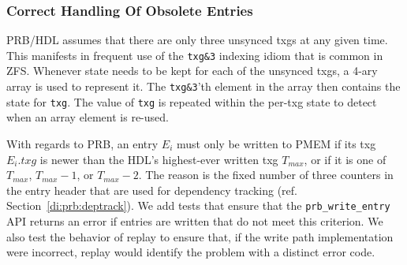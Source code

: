 \documentclass[12pt,a4paper,twoside]{book}
\begin{document}
\subsubsection{Correct Handling Of Obsolete Entries}
PRB/HDL assumes that there are only three unsynced txgs at any given time.
This manifests in frequent use of the \lstinline{txg&3} indexing idiom that is common in ZFS.
Whenever state needs to be kept for each of the unsynced txgs, a 4-ary array is used to represent it.
The \lstinline{txg&3}'th element in the array then contains the state for \lstinline{txg}.
The value of \lstinline{txg} is repeated within the per-txg state to detect when an array element is re-used.

With regards to PRB, an entry $E_i$ must only be written to PMEM if its txg $E_i.txg$ is newer than the HDL's highest-ever written txg $T_{max}$, or if it is one of $T_{max}$, $T_{max}-1$, or $T_{max}-2$.
The reason is the fixed number of three counters in the entry header that are used for dependency tracking (ref. Section~\ref{di:prb:deptrack}).
We add tests that ensure that the \lstinline{prb_write_entry} API returns an error if entries are written that do not meet this criterion.
We also test the behavior of replay to ensure that, if the write path implementation were incorrect, replay would identify the problem with a distinct error code.
\end{document}
